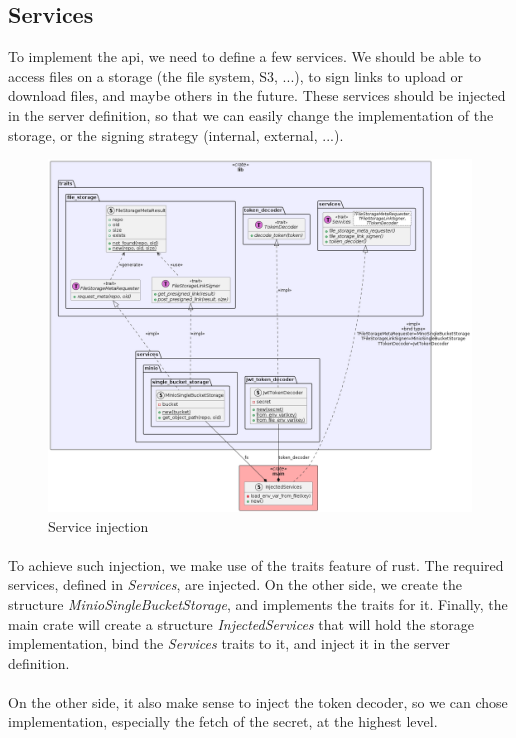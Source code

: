 \subsection{Services}

To implement the api, we need to define a few services. We should be able to access files on a storage (the file system, S3, ...), to sign links to upload or download files, and maybe others in the future. These services should be injected in the server definition, so that we can easily change the implementation of the storage, or the signing strategy (internal, external, ...).

\begin{figure}[H]
    \centering
    \includegraphics[width=\textwidth]{prototyping/diagrams/services_injection.png}
    \caption{Service injection}
    \label{fig:services_injection}
\end{figure}

\paragraph{}
To achieve such injection, we make use of the traits feature of rust. The required services, defined in \textit{Services}, are injected. On the other side, we create the structure \textit{MinioSingleBucketStorage}, and implements the traits for it. Finally, the main crate will create a structure \textit{InjectedServices} that will hold the storage implementation, bind the \textit{Services} traits to it, and inject it in the server definition.

\paragraph{}
On the other side, it also make sense to inject the token decoder, so we can chose implementation, especially the fetch of the secret, at the highest level. 
